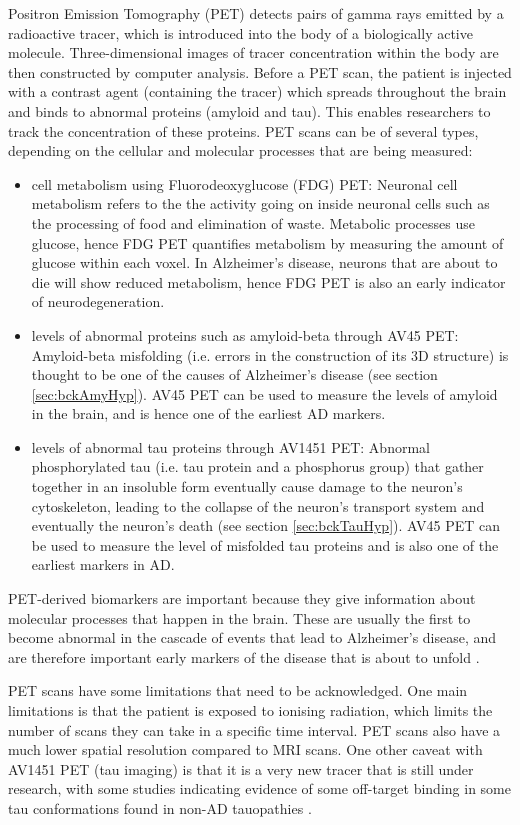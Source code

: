 Positron Emission Tomography (PET) detects pairs of gamma rays emitted by a radioactive tracer, which is introduced into the body of a biologically active molecule. Three-dimensional images of tracer concentration within the body are then constructed by computer analysis. Before a PET scan, the patient is injected with a contrast agent (containing the tracer) which spreads throughout the brain and binds to abnormal proteins (amyloid and tau). This enables researchers to track the concentration of these proteins. PET scans can be of several types, depending on the cellular and molecular processes that are being measured:
\begin{itemize}
\item cell metabolism using Fluorodeoxyglucose (FDG) PET: Neuronal cell metabolism refers to the the activity going on inside neuronal cells such as the processing of food and elimination of waste. Metabolic processes use glucose, hence FDG PET quantifies metabolism by measuring the amount of glucose within each voxel. In Alzheimer's disease, neurons that are about to die will show reduced metabolism, hence FDG PET is also an early indicator of neurodegeneration.
\item levels of abnormal proteins such as amyloid-beta through AV45 PET: Amyloid-beta misfolding (i.e. errors in the construction of its 3D structure) is thought to be one of the causes of Alzheimer's disease (see section \ref{sec:bckAmyHyp}). AV45 PET can be used to measure the levels of amyloid in the brain, and is hence one of the earliest AD markers.
\item levels of abnormal tau proteins through AV1451 PET: Abnormal phosphorylated tau (i.e. tau protein and a phosphorus group) that gather together in an insoluble form eventually cause damage to the neuron's cytoskeleton, leading to the collapse of the neuron's transport system and eventually the neuron's death (see section \ref{sec:bckTauHyp}). AV45 PET can be used to measure the level of misfolded tau proteins and is also one of the earliest markers in AD.
\end{itemize}

PET-derived biomarkers are important because they give information about molecular processes that happen in the brain. These are usually the first to become abnormal in the cascade of events that lead to Alzheimer's disease, and are therefore important early markers of the disease that is about to unfold \cite{jack2010hypothetical,jack2013update}.  

PET scans have some limitations that need to be acknowledged. One main limitations is that the patient is exposed to ionising radiation, which limits the number of scans they can take in a specific time interval. PET scans also have a much lower spatial resolution compared to MRI scans. One other caveat with AV1451 PET (tau imaging) is that it is a very new tracer that is still under research, with some studies indicating evidence of some off-target binding in some tau conformations found in non-AD tauopathies \cite{lowe2016autoradiographic,marquie2015validating}. 


